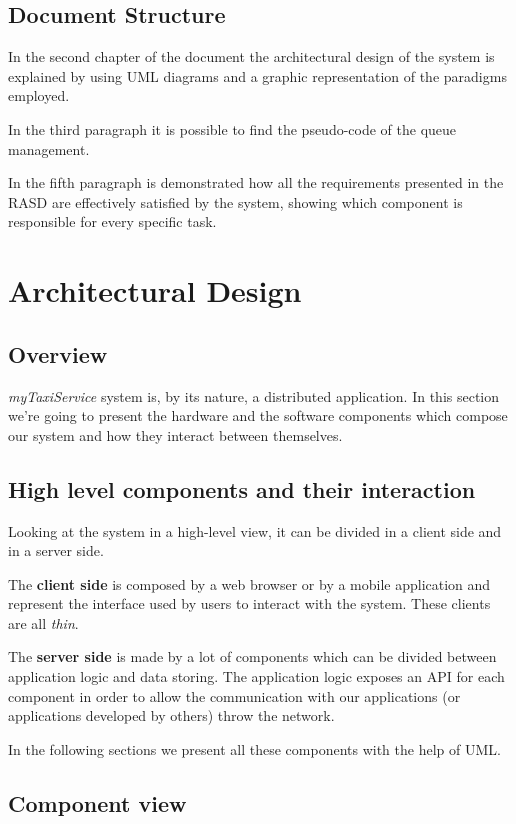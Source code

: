 \documentclass[a4paper]{article}
\begin{document}
\subsection{Document Structure}
In the second chapter of the document the architectural design of the system is explained by using UML diagrams and a graphic representation of the paradigms employed. 

In the third paragraph it is possible to find the pseudo-code of the queue management.

In the fifth paragraph is demonstrated how all the requirements presented in the RASD are effectively satisfied by the system, showing which component is responsible for every specific task.

\section{Architectural Design}

\subsection{Overview}

\emph{myTaxiService} system is, by its nature, a distributed application.
In this section we're going to present the hardware and the software components which compose our system and how they interact between themselves.

\subsection{High level components and their interaction}

Looking at the system in a high-level view, it can be divided in a client side and in a server side.

The \textbf{client side} is composed by a web browser or by a mobile application and represent the interface used by users to interact with the system. These clients are all \emph{thin}.

The \textbf{server side} is made by a lot of components which can be divided between application logic and data storing. The application logic exposes an API for each component in order to allow the communication with our applications (or applications developed by others) throw the network.

In the following sections we present all these components with the help of UML.

\subsection{Component view}
\end{document}
